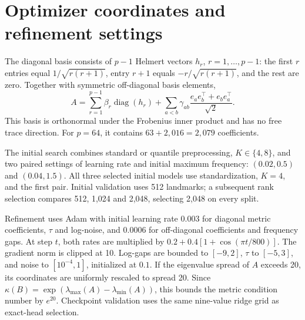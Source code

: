 \documentclass[11pt]{article}
\begin{document}
\appendix
\section{Optimizer coordinates and refinement settings}\label{app:training}
The diagonal basis consists of $p-1$ Helmert vectors $h_r$, $r=1,\ldots,p-1$: the first $r$ entries equal $1/\sqrt{r(r+1)}$, entry $r+1$ equals $-r/\sqrt{r(r+1)}$, and the rest are zero. Together with symmetric off-diagonal basis elements,
\begin{equation}
 A=\sum_{r=1}^{p-1}\beta_r\operatorname{diag}(h_r)
   +\sum_{a<b}\gamma_{ab}\frac{e_ae_b^\top+e_be_a^\top}{\sqrt2}.
\end{equation}
This basis is orthonormal under the Frobenius inner product and has no free trace direction. For $p=64$, it contains $63+2{,}016=2{,}079$ coefficients.

The initial search combines standard or quantile preprocessing, $K\in\{4,8\}$, and two paired settings of learning rate and initial maximum frequency: $(0.02,0.5)$ and $(0.04,1.5)$. All three selected initial models use standardization, $K=4$, and the first pair. Initial validation uses 512 landmarks; a subsequent rank selection compares 512, 1,024 and 2,048, selecting 2,048 on every split.

Refinement uses Adam with initial learning rate $0.003$ for diagonal metric coefficients, $\tau$ and log-noise, and $0.0006$ for off-diagonal coefficients and frequency gaps. At step $t$, both rates are multiplied by $0.2+0.4[1+\cos(\pi t/800)]$. The gradient norm is clipped at 10. Log-gaps are bounded to $[-9,2]$, $\tau$ to $[-5,3]$, and noise to $[10^{-4},1]$, initialized at $0.1$. If the eigenvalue spread of $A$ exceeds 20, its coordinates are uniformly rescaled to spread 20. Since $\kappa(B)=\exp(\lambda_{\max}(A)-\lambda_{\min}(A))$, this bounds the metric condition number by $e^{20}$. Checkpoint validation uses the same nine-value ridge grid as exact-head selection.
\end{document}
